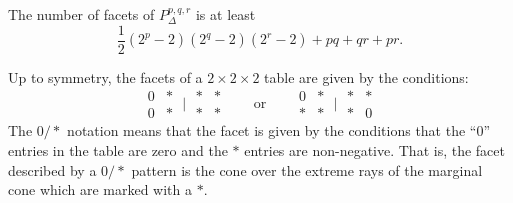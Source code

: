 \documentclass{elsart}
\begin{document}
\begin{prop}\label{prop:expmany}
The number of facets of $P_\Delta^{p,q,r}$
is at least
\[
\frac 1 2 (2^p-2)(2^q-2)(2^r-2) + pq + qr + pr.
\]
\end{prop}
\begin{pf}
Up to  symmetry, the facets of a $2\times 2 \times 2$ table
are given by the conditions:
\[
\begin{smallmatrix}
  0 & \ast \\  0 & \ast
\end{smallmatrix}
\mid
\begin{smallmatrix}
  \ast & \ast \\ \ast & \ast
\end{smallmatrix}
\;\;\;\;\;\;\; \mathrm{or} \;\;\;\;\;\;\; 
\begin{smallmatrix}
  0 & \ast \\  \ast & \ast
\end{smallmatrix}
\mid
\begin{smallmatrix}
  \ast & \ast \\ \ast & 0
\end{smallmatrix}
\]
The $0/\ast$ notation means that the facet is given by the
conditions that the ``0'' entries in the table are zero and the
$\ast$ entries are non-negative.  That is, the facet described by
a $0/\ast$ pattern is the cone over the extreme rays of the marginal
cone which are marked with a $\ast$.


\end{pf}
\end{document}
